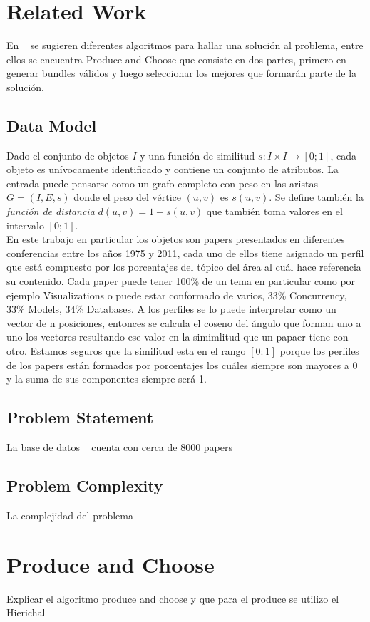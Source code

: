 \section{Related Work}
En ~\cite{compositeRetrival} se sugieren diferentes algoritmos para hallar una solución al problema, entre ellos se encuentra Produce and Choose que consiste en dos partes, primero en generar bundles válidos y luego seleccionar los mejores que formarán parte de la solución.\\
\subsection{Data Model}
Dado el conjunto de objetos $I$ y una función de similitud $ s: I \times I \rightarrow [0;1]$, cada objeto es unívocamente identificado y contiene un conjunto de atributos. La entrada puede pensarse como un grafo completo con peso en las aristas $G=(I,E,s)$ donde el peso del vértice $(u,v)$ es $s(u,v)$. Se define también la \textit{función de distancia} $d(u,v) = 1 - s(u,v)$ que también toma valores en el intervalo $[0;1]$.\\
En este trabajo en particular los objetos son papers presentados en diferentes conferencias entre los años 1975 y 2011, cada uno de ellos tiene asignado un perfil que está compuesto por los porcentajes del tópico del área al cuál hace referencia su contenido. Cada paper puede tener 100\% de un tema en particular como por ejemplo Visualizations o puede estar conformado de varios, 33\% Concurrency, 33\% Models, 34\% Databases. A los perfiles se lo puede interpretar como un vector de n posiciones, entonces se calcula el coseno del ángulo que forman uno a uno los vectores resultando ese valor en la simimlitud que un papaer tiene con otro. Estamos seguros que la similitud esta en el rango $[0:1]$ porque los perfiles de los papers están formados por porcentajes los cuáles siempre son mayores a 0 y la suma de sus componentes siempre será 1.
\subsection{Problem Statement}
La base de datos ~\cite{dataDrive} cuenta con cerca de 8000 papers 
\subsection{Problem Complexity}
La complejidad del problema
\section{Produce and Choose}
Explicar el algoritmo produce and choose y que para el produce se utilizo el Hierichal
